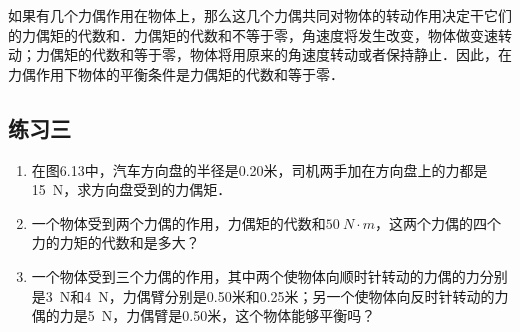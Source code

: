 如果有几个力偶作用在物体上，那么这几个力偶共同对物体的转动作用决定干它们的力偶矩的代数和．力偶矩的代数和不等于零，角速度将发生改变，物体做变速转动；力偶矩的代数和等于零，物体将用原来的角速度转动或者保持静止．因此，在力偶作用下物体的平衡条件是力偶矩的代数和等于零．

\subsection*{练习三}
\begin{enumerate}
	\item 在图6.13中，汽车方向盘的半径是0.20米，司机两手加在方向盘上的力都是\SI{15}{N}，求方向盘受到的力偶矩．
	\item 一个物体受到两个力偶的作用，力偶矩的代数和$\SI{50}{N\cdot m}$，这两个力偶的四个力的力矩的代数和是多大？
	\item 一个物体受到三个力偶的作用，其中两个使物体向顺时针转动的力偶的力分别是\SI{3}{N}和\SI{4}{N}，力偶臂分别是0.50米和0.25米；另一个使物体向反时针转动的力偶的力是\SI{5}{N}，力偶臂是0.50米，这个物体能够平衡吗？
\end{enumerate}
\newpage
